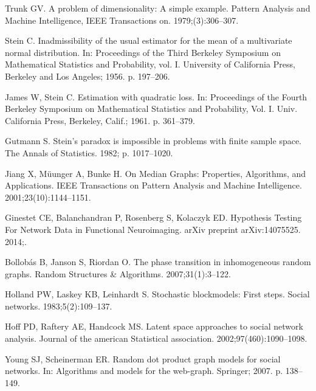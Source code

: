 \documentclass[10pt,letterpaper]{article}
\begin{document}
\begin{thebibliography}{10}

Trunk GV.
\newblock A problem of dimensionality: A simple example.
\newblock Pattern Analysis and Machine Intelligence, IEEE Transactions on.
  1979;(3):306--307.

Stein C.
\newblock Inadmissibility of the usual estimator for the mean of a multivariate
  normal distribution.
\newblock In: Proceedings of the {T}hird {B}erkeley {S}ymposium on
  {M}athematical {S}tatistics and {P}robability, vol. {I}. University of
  California Press, Berkeley and Los Angeles; 1956. p. 197--206.

James W, Stein C.
\newblock Estimation with quadratic loss.
\newblock In: Proceedings of the {F}ourth {B}erkeley {S}ymposium on
  {M}athematical {S}tatistics and {P}robability, {V}ol. {I}. Univ. California
  Press, Berkeley, Calif.; 1961. p. 361--379.

Gutmann S.
\newblock Stein's paradox is impossible in problems with finite sample space.
\newblock The Annals of Statistics. 1982; p. 1017--1020.

Jiang X, M{\"u}unger A, Bunke H.
\newblock On Median Graphs: Properties, Algorithms, and Applications.
\newblock IEEE Transactions on Pattern Analysis and Machine Intelligence.
  2001;23(10):1144--1151.

Ginestet CE, Balanchandran P, Rosenberg S, Kolaczyk ED.
\newblock Hypothesis Testing For Network Data in Functional Neuroimaging.
\newblock arXiv preprint arXiv:14075525. 2014;.

Bollob{\'a}s B, Janson S, Riordan O.
\newblock The phase transition in inhomogeneous random graphs.
\newblock Random Structures \& Algorithms. 2007;31(1):3--122.

Holland PW, Laskey KB, Leinhardt S.
\newblock Stochastic blockmodels: First steps.
\newblock Social networks. 1983;5(2):109--137.

Hoff PD, Raftery AE, Handcock MS.
\newblock Latent space approaches to social network analysis.
\newblock Journal of the american Statistical association.
  2002;97(460):1090--1098.

Young SJ, Scheinerman ER.
\newblock Random dot product graph models for social networks.
\newblock In: Algorithms and models for the web-graph. Springer; 2007. p.
  138--149.


\end{thebibliography}
\end{document}
